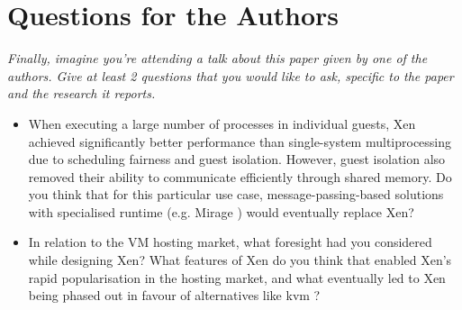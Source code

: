 \documentclass[11pt]{article}
\begin{document}
\section*{Questions for the Authors}
\textsl{Finally, imagine you're attending a talk about this paper given by one of the authors. Give at least 2 questions that you would like to ask, specific to the paper and the research it reports.}


\begin{itemize}
	\item When executing a large number of processes in individual guests, Xen achieved significantly better performance than single-system multiprocessing due to scheduling fairness and guest isolation. However, guest isolation also removed their ability to communicate efficiently through shared memory. Do you think that for this particular use case, message-passing-based solutions with specialised runtime (e.g. Mirage \cite{madhavapeddy2013unikernels}) would eventually replace Xen?
	\item In relation to the VM hosting market, what foresight had you considered while designing Xen? What features of Xen do you think that enabled Xen's rapid popularisation in the hosting market, and what eventually led to Xen being phased out in favour of alternatives like kvm \cite{kivity2007kvm}?
\end{itemize}


\footnotesize{}
\end{document}
